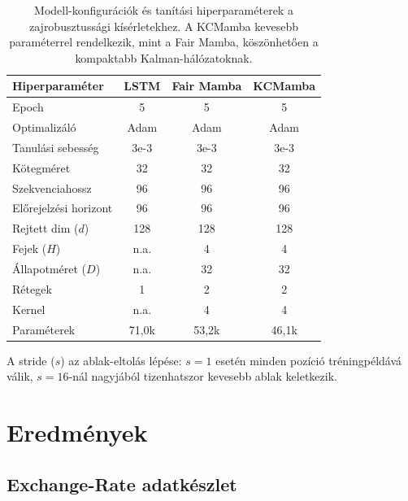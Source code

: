 \begin{table}[H]
    \centering
    \begin{tabular}{|l|c|c|c|}
        \hline
        \textbf{Hiperparaméter} & \textbf{LSTM} & \textbf{Fair Mamba} & KCMamba \\
        \hline\hline
        Epoch                & 5      & 5      & 5 \\
        Optimalizáló         & Adam   & Adam   & Adam \\
        Tanulási sebesség    & 3e-3   & 3e-3   & 3e-3 \\
        Kötegméret           & 32     & 32     & 32 \\
        Szekvenciahossz      & 96     & 96     & 96 \\
        Előrejelzési horizont & 96    & 96     & 96 \\
        Rejtett dim ($d$)    & 128    & 128    & 128 \\
        Fejek ($H$)          & n.a.      & 4      & 4 \\
        Állapotméret ($D$)   & n.a.      & 32     & 32 \\
        Rétegek              & 1      & 2      & 2 \\
        Kernel               & n.a.      & 4      & 4 \\
        \hline
        Paraméterek          & 71{,}0k & 53{,}2k & 46{,}1k \\
        \hline
    \end{tabular}
    \caption{Modell-konfigurációk és tanítási hiperparaméterek a zajrobusztussági
             kísérletekhez. A KCMamba kevesebb paraméterrel rendelkezik, mint a
             Fair Mamba, köszönhetően a kompaktabb Kalman-hálózatoknak.}
    \label{tab:hyperparams}
\end{table}

A stride ($s$) az ablak-eltolás lépése: $s=1$ esetén minden pozíció
tréningpéldává válik, $s=16$-nál nagyjából tizenhatszor kevesebb ablak keletkezik.


\section{Eredmények}
\label{sec:results}

\subsection{Exchange-Rate adatkészlet}

